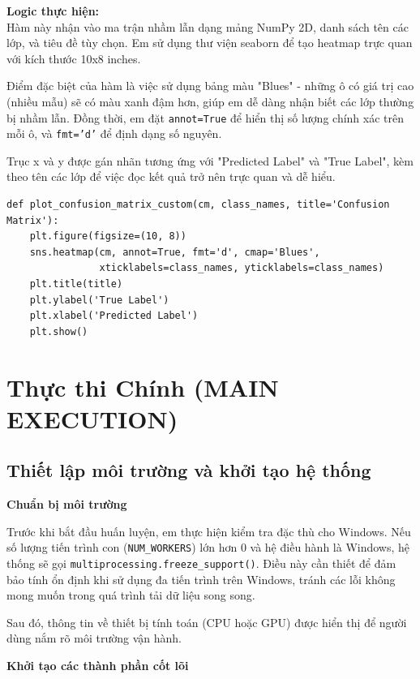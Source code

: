 \documentclass[12pt, a4paper, openany]{report}
\begin{document}
\textbf{Logic thực hiện:} \\
Hàm này nhận vào ma trận nhầm lẫn dạng mảng NumPy 2D, danh sách tên các lớp, và tiêu đề tùy chọn. Em sử dụng thư viện seaborn để tạo heatmap trực quan với kích thước 10x8 inches. 

Điểm đặc biệt của hàm là việc sử dụng bảng màu "Blues" - những ô có giá trị cao (nhiều mẫu) sẽ có màu xanh đậm hơn, giúp em dễ dàng nhận biết các lớp thường bị nhầm lẫn. Đồng thời, em đặt \texttt{annot=True} để hiển thị số lượng chính xác trên mỗi ô, và \texttt{fmt='d'} để định dạng số nguyên. 

Trục x và y được gán nhãn tương ứng với "Predicted Label" và "True Label", kèm theo tên các lớp để việc đọc kết quả trở nên trực quan và dễ hiểu.

\begin{verbatim}
def plot_confusion_matrix_custom(cm, class_names, title='Confusion Matrix'):
    plt.figure(figsize=(10, 8))
    sns.heatmap(cm, annot=True, fmt='d', cmap='Blues',
                xticklabels=class_names, yticklabels=class_names)
    plt.title(title)
    plt.ylabel('True Label')
    plt.xlabel('Predicted Label')
    plt.show()
\end{verbatim}

\section{Thực thi Chính (MAIN EXECUTION)}
\subsection{Thiết lập môi trường và khởi tạo hệ thống}
\textbf{Chuẩn bị môi trường} 

Trước khi bắt đầu huấn luyện, em thực hiện kiểm tra đặc thù cho Windows. Nếu số lượng tiến trình con (\texttt{NUM\_WORKERS}) lớn hơn 0 và hệ điều hành là Windows, hệ thống sẽ gọi \texttt{multiprocessing.freeze\_support()}. Điều này cần thiết để đảm bảo tính ổn định khi sử dụng đa tiến trình trên Windows, tránh các lỗi không mong muốn trong quá trình tải dữ liệu song song. 

Sau đó, thông tin về thiết bị tính toán (CPU hoặc GPU) được hiển thị để người dùng nắm rõ môi trường vận hành.

\textbf{Khởi tạo các thành phần cốt lõi} 
\end{document}
